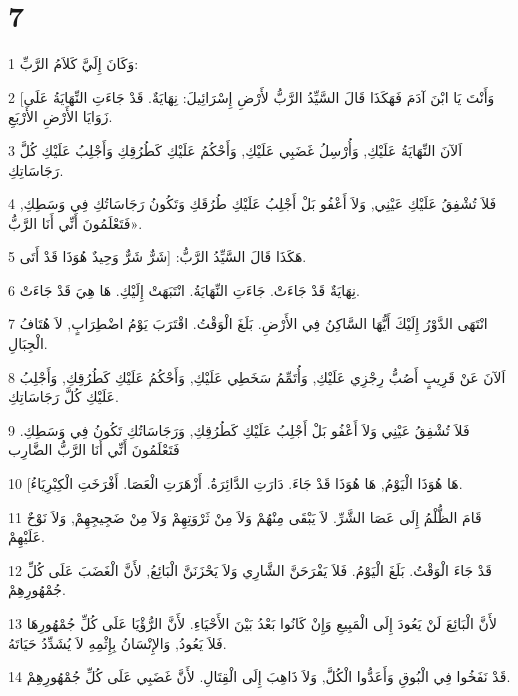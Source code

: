 \chapter{7}

\par 1 وَكَانَ إِلَيَّ كَلاَمُ الرَّبِّ:
\par 2 [وَأَنْتَ يَا ابْنَ آدَمَ فَهَكَذَا قَالَ السَّيِّدُ الرَّبُّ لأَرْضِ إِسْرَائِيلَ: نِهَايَةٌ. قَدْ جَاءَتِ النِّهَايَةُ عَلَى زَوَايَا الأَرْضِ الأَرْبَعِ.
\par 3 اَلآنَ النِّهَايَةُ عَلَيْكِ, وَأُرْسِلُ غَضَبِي عَلَيْكِ, وَأَحْكُمُ عَلَيْكِ كَطُرُقِكِ وَأَجْلِبُ عَلَيْكِ كُلَّ رَجَاسَاتِكِ.
\par 4 فَلاَ تُشْفِقُ عَلَيْكِ عَيْنِي, وَلاَ أَعْفُو بَلْ أَجْلِبُ عَلَيْكِ طُرُقَكِ وَتَكُونُ رَجَاسَاتُكِ فِي وَسَطِكِ, فَتَعْلَمُونَ أَنِّي أَنَا الرَّبُّ».
\par 5 هَكَذَا قَالَ السَّيِّدُ الرَّبُّ: [شَرٌّ شَرٌّ وَحِيدٌ هُوَذَا قَدْ أَتَى.
\par 6 نِهَايَةٌ قَدْ جَاءَتْ. جَاءَتِ النِّهَايَةُ. انْتَبَهَتْ إِلَيْكِ. هَا هِيَ قَدْ جَاءَتْ.
\par 7 انْتَهَى الدَّوْرُ إِلَيْكَ أَيُّهَا السَّاكِنُ فِي الأَرْضِ. بَلَغَ الْوَقْتُ. اقْتَرَبَ يَوْمُ اضْطِرَابٍ, لاَ هُتَافُ الْجِبَالِ.
\par 8 اَلآنَ عَنْ قَرِيبٍ أَصُبُّ رِجْزِي عَلَيْكِ, وَأُتَمِّمُ سَخَطِي عَلَيْكِ, وَأَحْكُمُ عَلَيْكِ كَطُرُقِكِ, وَأَجْلِبُ عَلَيْكِ كُلَّ رَجَاسَاتِكِ.
\par 9 فَلاَ تُشْفِقُ عَيْنِي وَلاَ أَعْفُو بَلْ أَجْلِبُ عَلَيْكِ كَطُرُقِكِ, وَرَجَاسَاتُكِ تَكُونُ فِي وَسَطِكِ. فَتَعْلَمُونَ أَنِّي أَنَا الرَّبُّ الضَّارِب
\par 10 [هَا هُوَذَا الْيَوْمُ, هَا هُوَذَا قَدْ جَاءَ. دَارَتِ الدَّائِرَةُ. أَزْهَرَتِ الْعَصَا. أَفْرَخَتِ الْكِبْرِيَاءُ.
\par 11 قَامَ الظُّلْمُ إِلَى عَصَا الشَّرِّ. لاَ يَبْقَى مِنْهُمْ وَلاَ مِنْ ثَرْوَتِهِمْ وَلاَ مِنْ ضَجِيجِهِمْ, وَلاَ نَوْحٌ عَلَيْهِمْ.
\par 12 قَدْ جَاءَ الْوَقْتُ. بَلَغَ الْيَوْمُ. فَلاَ يَفْرَحَنَّ الشَّارِي وَلاَ يَحْزَنَنَّ الْبَائِعُ, لأَنَّ الْغَضَبَ عَلَى كُلِّ جُمْهُورِهِمْ.
\par 13 لأَنَّ الْبَائِعَ لَنْ يَعُودَ إِلَى الْمَبِيعِ وَإِنْ كَانُوا بَعْدُ بَيْنَ الأَحْيَاءِ. لأَنَّ الرُّؤْيَا عَلَى كُلِّ جُمْهُورِهَا فَلاَ يَعُودُ, وَالإِنْسَانُ بِإِثْمِهِ لاَ يُشَدِّدُ حَيَاتَهُ.
\par 14 قَدْ نَفَخُوا فِي الْبُوقِ وَأَعَدُّوا الْكُلَّ, وَلاَ ذَاهِبَ إِلَى الْقِتَالِ. لأَنَّ غَضَبِي عَلَى كُلِّ جُمْهُورِهِمْ.
